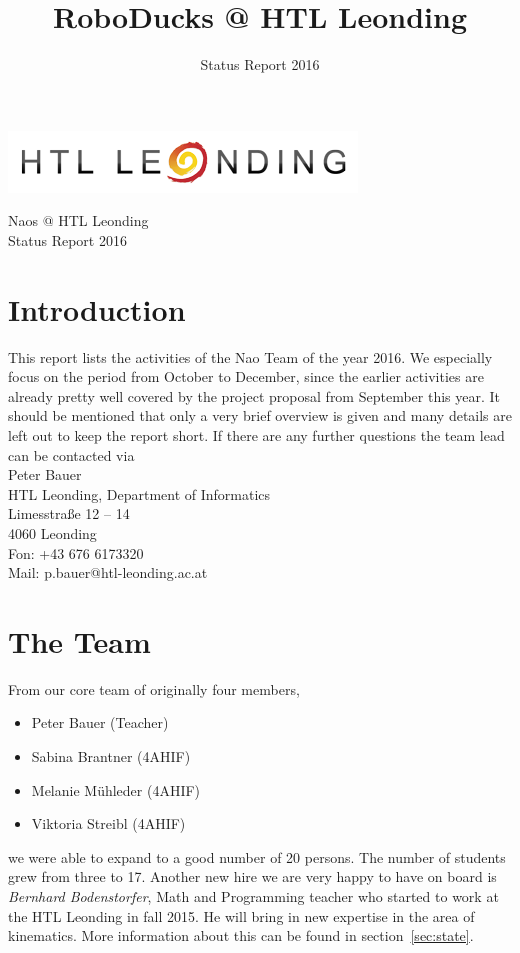\documentclass[11pt]{article}
\title{RoboDucks @ HTL Leonding}
\author{Status Report 2016}
\begin{document}
\begin{titlepage}
\begin{flushright}
\includegraphics[scale=.5]{../img/htlleondinglogo.png}\\
\end{flushright}

\vspace{10em}

\begin{center}
{\Huge Naos @ HTL Leonding} \\[3em]
{\LARGE Status Report 2016} \\[3em]
\end{center}
\end{titlepage}

\section{Introduction}
This report lists the activities of the Nao Team of the year 2016. We especially focus  on the period from October to December, since the earlier activities are already pretty well covered by the project proposal from September this year. It should be mentioned that only  a very brief overview is given and many details are left out to keep the report short. If there are any further questions the team lead can be contacted via \\[1em]
Peter Bauer\\
HTL Leonding, Department of Informatics\\
Limesstraße 12 -- 14\\
4060 Leonding\\
Fon: +43 676 6173320\\
Mail: p.bauer@htl-leonding.ac.at

\section{The Team}
From our core team of originally four members,
\begin{itemize}
	\item Peter Bauer (Teacher)
	\item Sabina Brantner (4AHIF)
	\item Melanie Mühleder (4AHIF)
	\item Viktoria Streibl (4AHIF)
\end{itemize}
we were able to expand to a good number of 20 persons. The number of students grew from three to 17.
Another new hire we are very happy to have on board is {\em Bernhard Bodenstorfer},  Math and Programming teacher who started to work at the HTL Leonding in fall 2015. He will bring in new expertise in the area of kinematics. More information about this can be found in section~\ref{sec:state}.
\end{document}
